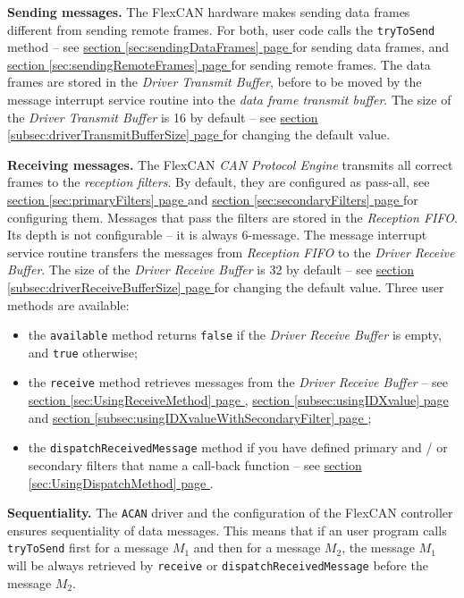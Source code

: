 \documentclass[10pt, a4paper, obeyspaces, openany]{extarticle}
\newcommand\refSectionPage[1]{\hyperref[sec:#1]{section \ref*{sec:#1} page \pageref{sec:#1}}}
\newcommand\refSubsectionPage[1]{\hyperref[subsec:#1]{section \ref*{subsec:#1} page \pageref{subsec:#1}}}
\begin{document}
{\bf Sending messages.} The FlexCAN hardware makes sending data frames different from sending remote frames. For both, user code calls the \texttt{tryToSend} method -- see \refSectionPage{sendingDataFrames} for sending data frames, and \refSectionPage{sendingRemoteFrames} for sending remote frames. The data frames are stored in the \emph{Driver Transmit Buffer}, before to be moved by the message interrupt service routine into the \emph{data frame transmit buffer}. The size of the \emph{Driver Transmit Buffer} is 16 by default -- see \refSubsectionPage{driverTransmitBufferSize} for changing the default value.


{\bf Receiving messages.} The FlexCAN \emph{CAN Protocol Engine} transmits all correct frames to the \emph{reception filters}. By default, they are configured as pass-all, see \refSectionPage{primaryFilters} and  \refSectionPage{secondaryFilters} for configuring them. Messages that pass the filters are stored in the \emph{Reception FIFO}. Its depth is not configurable -- it is always 6-message. The message interrupt service routine transfers the messages from \emph{Reception FIFO} to the \emph{Driver Receive Buffer}. The size of the \emph{Driver Receive Buffer} is 32 by default -- see \refSubsectionPage{driverReceiveBufferSize} for changing the default value. Three user methods are available:
\begin{itemize}
  \item the \texttt{available} method returns \texttt{false} if the \emph{Driver Receive Buffer} is empty, and \texttt{true} otherwise;
  \item the \texttt{receive} method retrieves messages from the \emph{Driver Receive Buffer} -- see \refSectionPage{UsingReceiveMethod}, \refSubsectionPage{usingIDXvalue} and \refSubsectionPage{usingIDXvalueWithSecondaryFilter};
  \item the \texttt{dispatchReceivedMessage} method if you have defined primary and / or secondary filters that name a call-back function -- see \refSectionPage{UsingDispatchMethod}.
\end{itemize}

{\bf Sequentiality.} The \texttt{ACAN} driver and the configuration of the FlexCAN controller ensures sequentiality of data messages. This means that if an user program calls \texttt{tryToSend} first for a message $M_1$ and then for a message $M_2$, the message $M_1$ will be always retrieved by \texttt{receive} or \texttt{dispatchReceivedMessage} before the message $M_2$.
\end{document}

